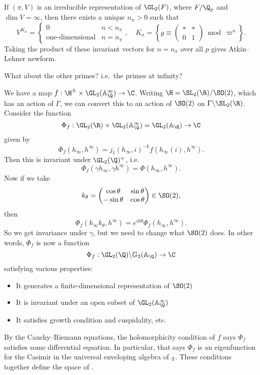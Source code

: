 \documentclass[a4paper]{article}
\renewcommand\G{\mathbb{G}}
\newcommand\A{\mathbb{A}}
\begin{document}
\begin{thm}
  If $(\pi, V)$ is an irreducible representation of $\GL_2(F)$, where $F/\Q_p$ and $\dim V = \infty$, then there exists a unique $n_\pi > 0$ such that
  \[
    V^{K_n} =
    \begin{cases}
      0 & n < n_\pi\\
      \text{one-dimensional} & n = n_\pi
    \end{cases},\quad K_n = \left\{
      g \equiv
      \begin{pmatrix}
        * & *\\
        0 & 1
      \end{pmatrix}\bmod \varpi^n
    \right\}.
  \]
  Taking the product of these invariant vectors for $n = n_\pi$ over all $p$ gives Atkin--Lehner newform.
\end{thm}

What about the other primes? i.e.\ the primes at infinity?

We have a map $f: \H^{\pm} \times \GL_2(\A_\Q^\infty) \to \C$. Writing $\H = \SL_2(\R)/\SO(2)$, which has an action of $\Gamma$, we can convert this to an action of $\SO(2)$ on $\Gamma \backslash \SL_2(\R)$. Consider the function
\[
  \Phi_f: \GL_2(\R) \times \GL_2(\A_\Q^\infty) = \GL_2(\A_\Q) \to \C
\]
given by
\[
  \Phi_f(h_\infty, h^\infty) = j_1(h_\infty, i)^{-k} f(h_\infty(i), h^\infty).
\]
Then this is invariant under $\GL_2(\Q)^+$, i.e.
\[
  \Phi_f(\gamma h_\infty, \gamma h^\infty) = \Phi(h_\infty, h^\infty).
\]
Now if we take
\[
  k_\theta =
  \begin{pmatrix}
    \cos \theta & \sin \theta\\
    -\sin \theta & \cos \theta
  \end{pmatrix} \in \SO(2),
\]
then
\[
  \Phi_f(h_\infty k_\theta, h^\infty) = e^{ik\theta} \Phi_f(h_\infty, h^\infty).
\]
So we get invariance under $\gamma$, but we need to change what $\SO(2)$ does. In other words, $\Phi_f$ is now a function
\[
  \Phi_f: \GL_2(\Q) \backslash \G_2(\A_\Q) \to \C
\]
satisfying various properties:
\begin{itemize}
  \item It generates a finite-dimensional representation of $\SO(2)$
  \item It is invariant under an open subset of $\GL_2(\A^\infty_\Q)$
  \item It satisfies growth condition and cuspidality, etc.
\end{itemize}
By the Cauchy--Riemann equations, the holomorphicity condition of $f$ says $\Phi_f$ satisfies some differential equation. In particular, that says $\Phi_f$ is an eigenfunction for the Casimir in the universal enveloping algebra of $\sl_2$. These conditions together define the space of .
\end{document}
